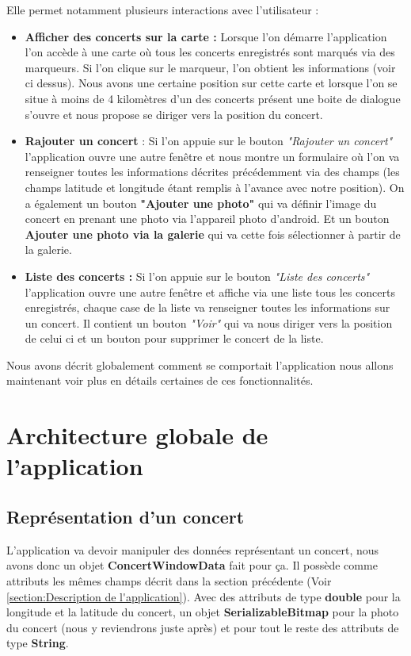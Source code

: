 \documentclass{article}
\begin{document}
Elle permet notamment plusieurs interactions avec l'utilisateur : 
\begin{itemize}
\item \textbf{Afficher des concerts sur la carte : } Lorsque l'on démarre l'application l'on accède à une carte où tous les concerts enregistrés sont marqués via des marqueurs. Si l'on clique sur le marqueur, l'on obtient les informations (voir ci dessus). Nous avons une certaine position sur cette carte et lorsque l'on se situe à moins de 4 kilomètres d'un des concerts présent une boite de dialogue s'ouvre et nous propose se diriger vers la position du concert.
\item \textbf{Rajouter un concert} : Si l'on appuie sur le bouton \textit{"Rajouter un concert"} l'application ouvre une autre fenêtre et nous montre un formulaire où l'on va renseigner toutes les informations décrites précédemment via des champs (les champs latitude et longitude étant remplis à l'avance avec notre position). On a également un bouton \textbf{"Ajouter une photo"} qui va définir l'image du concert en prenant une photo via l'appareil photo d'android. Et un bouton \textbf{Ajouter une photo via la galerie} qui va cette fois sélectionner à partir de la galerie.
\item \textbf{Liste des concerts :} Si l'on appuie sur le bouton \textit{"Liste des concerts"} l'application ouvre une autre fenêtre et affiche via une liste tous les concerts enregistrés, chaque case de la liste va renseigner toutes les informations sur un concert. Il contient un bouton \textit{"Voir"} qui va nous diriger vers la position de celui ci et un bouton pour supprimer le concert de la liste. 
\end{itemize}

Nous avons décrit globalement comment se comportait l'application nous allons maintenant voir plus en détails certaines de ces fonctionnalités. 

\section{Architecture globale de l'application}

\subsection{Représentation d'un concert}
\label{subsection:concert}

L'application va devoir manipuler des données représentant un concert, nous avons donc un objet \textbf{ConcertWindowData} fait pour ça.
Il possède comme attributs les mêmes champs décrit dans la section précédente (Voir \ref{section:Description de l'application}). Avec des attributs de type \textbf{double} pour la longitude et la latitude du concert, un objet \textbf{SerializableBitmap} pour la photo du concert (nous y reviendrons juste après) et pour tout le reste des attributs de type \textbf{String}. 
\end{document}

